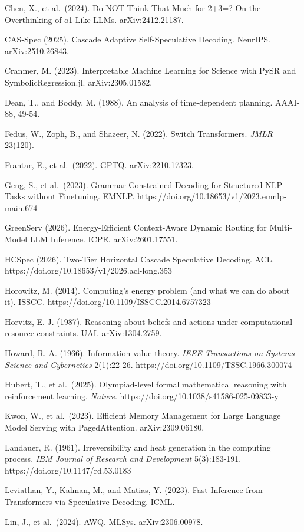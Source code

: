 \documentclass[
  10pt,
]{article}
\begin{document}
Chen, X., et al.~(2024). Do NOT Think That Much for 2+3=? On the
Overthinking of o1-Like LLMs. arXiv:2412.21187.

CAS-Spec (2025). Cascade Adaptive Self-Speculative Decoding. NeurIPS.
arXiv:2510.26843.

Cranmer, M. (2023). Interpretable Machine Learning for Science with PySR
and SymbolicRegression.jl. arXiv:2305.01582.

Dean, T., and Boddy, M. (1988). An analysis of time-dependent planning.
AAAI-88, 49-54.

Fedus, W., Zoph, B., and Shazeer, N. (2022). Switch Transformers.
\emph{JMLR} 23(120).

Frantar, E., et al.~(2022). GPTQ. arXiv:2210.17323.

Geng, S., et al.~(2023). Grammar-Constrained Decoding for Structured NLP
Tasks without Finetuning. EMNLP.
https://doi.org/10.18653/v1/2023.emnlp-main.674

GreenServ (2026). Energy-Efficient Context-Aware Dynamic Routing for
Multi-Model LLM Inference. ICPE. arXiv:2601.17551.

HCSpec (2026). Two-Tier Horizontal Cascade Speculative Decoding. ACL.
https://doi.org/10.18653/v1/2026.acl-long.353

Horowitz, M. (2014). Computing's energy problem (and what we can do
about it). ISSCC. https://doi.org/10.1109/ISSCC.2014.6757323

Horvitz, E. J. (1987). Reasoning about beliefs and actions under
computational resource constraints. UAI. arXiv:1304.2759.

Howard, R. A. (1966). Information value theory. \emph{IEEE Transactions
on Systems Science and Cybernetics} 2(1):22-26.
https://doi.org/10.1109/TSSC.1966.300074

Hubert, T., et al.~(2025). Olympiad-level formal mathematical reasoning
with reinforcement learning. \emph{Nature}.
https://doi.org/10.1038/s41586-025-09833-y

Kwon, W., et al.~(2023). Efficient Memory Management for Large Language
Model Serving with PagedAttention. arXiv:2309.06180.

Landauer, R. (1961). Irreversibility and heat generation in the
computing process. \emph{IBM Journal of Research and Development}
5(3):183-191. https://doi.org/10.1147/rd.53.0183

Leviathan, Y., Kalman, M., and Matias, Y. (2023). Fast Inference from
Transformers via Speculative Decoding. ICML.

Lin, J., et al.~(2024). AWQ. MLSys. arXiv:2306.00978.
\end{document}
